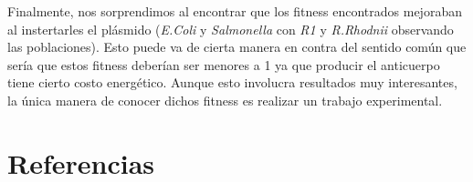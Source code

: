 \documentclass[12pt]{article}
\numberwithin{equation}{section}
\begin{document}
Finalmente, nos sorprendimos al encontrar que los fitness encontrados mejoraban al instertarles el plásmido (\textit{E.Coli} y \textit{Salmonella} con \textit{R1} y \textit{R.Rhodnii} observando las poblaciones). Esto puede va de cierta manera en contra del sentido común que sería que estos fitness deberían ser menores a 1 ya que producir el anticuerpo tiene cierto costo energético. Aunque esto involucra resultados muy interesantes, la única manera de conocer dichos fitness es realizar un trabajo experimental.

\renewcommand\refname{\vskip -1cm}
\section{Referencias}
\nocite{*}












\end{document}
